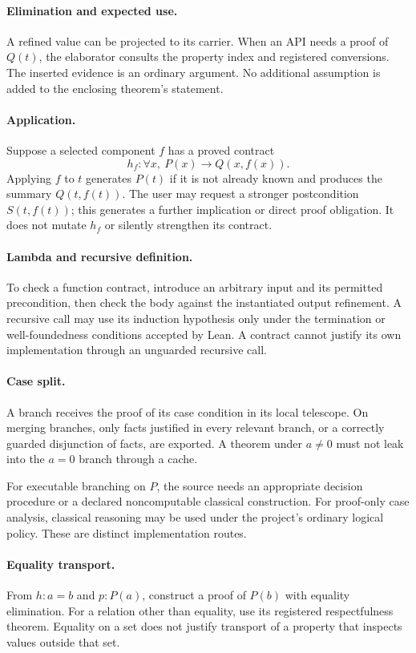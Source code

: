 \documentclass[11pt,letterpaper]{article}
\theoremstyle{definition}\newtheorem{definition}[theorem]{Definition}
\begin{document}
\paragraph{Elimination and expected use.}
A refined value can be projected to its carrier. When an API needs a proof of $Q(t)$, the elaborator consults the property index and registered conversions. The inserted evidence is an ordinary argument. No additional assumption is added to the enclosing theorem's statement.

\paragraph{Application.}
Suppose a selected component $f$ has a proved contract
\[
 h_f:\forall x,\ P(x)\to Q(x,f(x)).
\]
Applying $f$ to $t$ generates $P(t)$ if it is not already known and produces the summary $Q(t,f(t))$. The user may request a stronger postcondition $S(t,f(t))$; this generates a further implication or direct proof obligation. It does not mutate $h_f$ or silently strengthen its contract.

\paragraph{Lambda and recursive definition.}
To check a function contract, introduce an arbitrary input and its permitted precondition, then check the body against the instantiated output refinement. A recursive call may use its induction hypothesis only under the termination or well-foundedness conditions accepted by Lean. A contract cannot justify its own implementation through an unguarded recursive call.

\paragraph{Case split.}
A branch receives the proof of its case condition in its local telescope. On merging branches, only facts justified in every relevant branch, or a correctly guarded disjunction of facts, are exported. A theorem under $a\ne0$ must not leak into the $a=0$ branch through a cache.

For executable branching on $P$, the source needs an appropriate decision procedure or a declared noncomputable classical construction. For proof-only case analysis, classical reasoning may be used under the project's ordinary logical policy. These are distinct implementation routes.

\paragraph{Equality transport.}
From $h:a=b$ and $p:P(a)$, construct a proof of $P(b)$ with equality elimination. For a relation other than equality, use its registered respectfulness theorem. Equality on a set does not justify transport of a property that inspects values outside that set.
\end{document}
